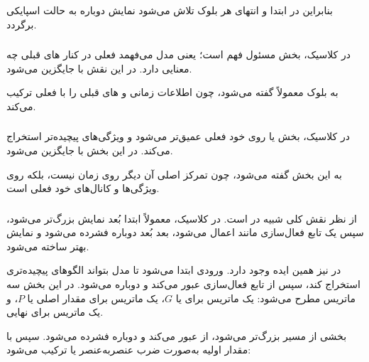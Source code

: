 بنابراین در ابتدا و انتهای هر بلوک تلاش می‌شود نمایش دوباره به حالت اسپایکی برگردد.


\subsubsection{}
در  کلاسیک، بخش  مسئول فهم  است؛ یعنی مدل می‌فهمد  فعلی در کنار های قبلی چه معنایی دارد. در  این نقش با  جایگزین می‌شود.

به بلوک  معمولاً  گفته می‌شود، چون اطلاعات زمانی و های قبلی را با  فعلی ترکیب می‌کند.

\subsubsection{}
در  کلاسیک، بخش  یا  روی خود  فعلی عمیق‌تر می‌شود و ویژگی‌های پیچیده‌تر استخراج می‌کند. در  این بخش با  جایگزین می‌شود.

به این بخش  گفته می‌شود، چون تمرکز اصلی آن دیگر روی زمان نیست، بلکه روی ویژگی‌ها و کانال‌های خود  فعلی است.

\subsubsection{}
 از نظر نقش کلی شبیه  در  است. در  کلاسیک، معمولاً ابتدا بُعد نمایش بزرگ‌تر می‌شود، سپس یک تابع فعال‌سازی مانند  اعمال می‌شود، بعد بُعد دوباره فشرده می‌شود و نمایش بهتر ساخته می‌شود.

در  نیز همین ایده وجود دارد. ورودی ابتدا  می‌شود تا مدل بتواند الگوهای پیچیده‌تری استخراج کند، سپس از تابع فعال‌سازی عبور می‌کند و دوباره  می‌شود. در این بخش سه ماتریس مطرح می‌شود: یک ماتریس برای  یا \(G\)، یک ماتریس برای مقدار اصلی یا \(P\)، و یک ماتریس برای  نهایی.

بخشی از مسیر بزرگ‌تر می‌شود، از  عبور می‌کند و دوباره فشرده می‌شود. سپس با مقدار اولیه به‌صورت ضرب عنصر‌به‌عنصر یا  ترکیب می‌شود:

